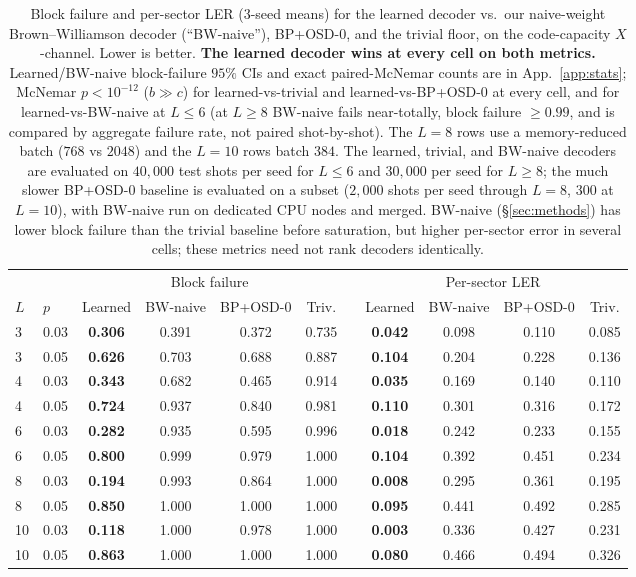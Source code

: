 \documentclass[11pt,a4paper]{article}
\begin{document}
\begin{table}[t]
\centering
\footnotesize
\setlength{\tabcolsep}{4.5pt}
\caption{Block failure and per-sector LER (3-seed means) for the learned decoder
vs.\ our naive-weight Brown--Williamson decoder (``BW-naive''), BP+OSD-0, and the
trivial floor, on the code-capacity $X$-channel. Lower is better. \textbf{The
learned decoder wins at every cell on both metrics.} Learned/BW-naive
block-failure $95\%$ CIs and exact paired-McNemar counts are in
App.~\ref{app:stats}; McNemar $p < 10^{-12}$
($b \gg c$) for learned-vs-trivial and learned-vs-BP+OSD-0 at every cell, and for
learned-vs-BW-naive at $L\le 6$ (at $L\ge 8$ BW-naive fails near-totally, block
failure $\ge 0.99$, and is compared by aggregate failure rate, not paired
shot-by-shot). The $L=8$ rows use a
memory-reduced batch ($768$ vs $2048$) and the $L=10$ rows batch $384$. The
learned, trivial, and BW-naive decoders are evaluated on $40{,}000$ test shots
per seed for $L\le 6$ and $30{,}000$ per seed for $L\ge 8$; the much slower
BP+OSD-0 baseline is evaluated on a subset ($2{,}000$ shots per seed through
$L=8$, $300$ at $L=10$), with BW-naive run on dedicated CPU nodes and merged.
BW-naive
(\S\ref{sec:methods}) has lower block failure than the trivial baseline
before saturation, but higher per-sector error in several cells; these
metrics need not rank decoders identically.}
\label{tab:main}
\begin{tabular}{ll cccc c cccc}
\toprule
 & & \multicolumn{4}{c}{Block failure} & & \multicolumn{4}{c}{Per-sector LER} \\
\cmidrule(lr){3-6}\cmidrule(lr){8-11}
$L$ & $p$ & Learned & BW-naive & BP+OSD-0 & Triv. & & Learned & BW-naive & BP+OSD-0 & Triv. \\
\midrule
3 & 0.03 & \textbf{0.306} & 0.391 & 0.372 & 0.735 & & \textbf{0.042} & 0.098 & 0.110 & 0.085 \\
3 & 0.05 & \textbf{0.626} & 0.703 & 0.688 & 0.887 & & \textbf{0.104} & 0.204 & 0.228 & 0.136 \\
4 & 0.03 & \textbf{0.343} & 0.682 & 0.465 & 0.914 & & \textbf{0.035} & 0.169 & 0.140 & 0.110 \\
4 & 0.05 & \textbf{0.724} & 0.937 & 0.840 & 0.981 & & \textbf{0.110} & 0.301 & 0.316 & 0.172 \\
6 & 0.03 & \textbf{0.282} & 0.935 & 0.595 & 0.996 & & \textbf{0.018} & 0.242 & 0.233 & 0.155 \\
6 & 0.05 & \textbf{0.800} & 0.999 & 0.979 & 1.000 & & \textbf{0.104} & 0.392 & 0.451 & 0.234 \\
8 & 0.03 & \textbf{0.194} & 0.993 & 0.864 & 1.000 & & \textbf{0.008} & 0.295 & 0.361 & 0.195 \\
8 & 0.05 & \textbf{0.850} & 1.000 & 1.000 & 1.000 & & \textbf{0.095} & 0.441 & 0.492 & 0.285 \\
10 & 0.03 & \textbf{0.118} & 1.000 & 0.978 & 1.000 & & \textbf{0.003} & 0.336 & 0.427 & 0.231 \\
10 & 0.05 & \textbf{0.863} & 1.000 & 1.000 & 1.000 & & \textbf{0.080} & 0.466 & 0.494 & 0.326 \\
\bottomrule
\end{tabular}
\end{table}
\end{document}
